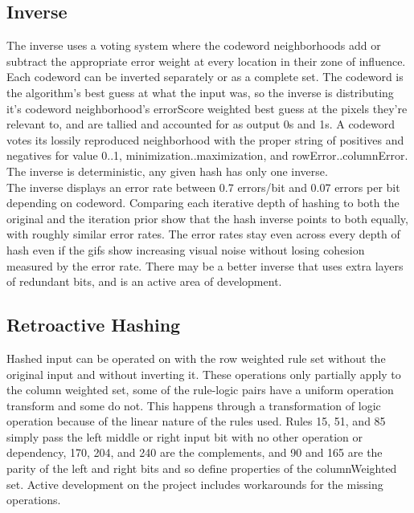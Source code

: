 \documentclass[11pt]{article}
\begin{document}
\subsection{Inverse}

The inverse uses a voting system where the codeword neighborhoods add or subtract the appropriate error weight at every location in their zone of influence. Each codeword can be inverted separately or as a complete set. The codeword is the algorithm's best guess at what the input was, so the inverse is distributing it's codeword neighborhood's errorScore weighted best guess at the pixels they're relevant to, and are tallied and accounted for as output 0s and 1s. A codeword votes its lossily reproduced neighborhood with the proper string of positives and negatives  for value 0..1, minimization..maximization, and rowError..columnError. The inverse is deterministic, any given hash has only one inverse.\\

The inverse displays an error rate between 0.7 errors/bit and 0.07 errors per bit depending on codeword. Comparing each iterative depth of hashing to both the original and the iteration prior show that the hash inverse points to both equally, with roughly similar error rates. The error rates stay even across every depth of hash even if the gifs show increasing visual noise without losing cohesion measured by the error rate. There may be a better inverse that uses extra layers of redundant bits, and is an active area of development. \\

\subsection{Retroactive Hashing}
Hashed input can be operated on with the row weighted rule set without the original input and without inverting it. These operations only partially apply to the column weighted set, some of the rule-logic pairs have a uniform operation transform and some do not. This happens through a transformation of logic operation because of the linear nature of the rules used. Rules 15, 51, and 85 simply pass the left middle or right input bit with no other operation or dependency, 170, 204, and 240 are the complements, and 90 and 165 are the parity of the left and right bits and so define properties of the columnWeighted set. Active development on the project includes workarounds for the missing operations.\\
\end{document}
